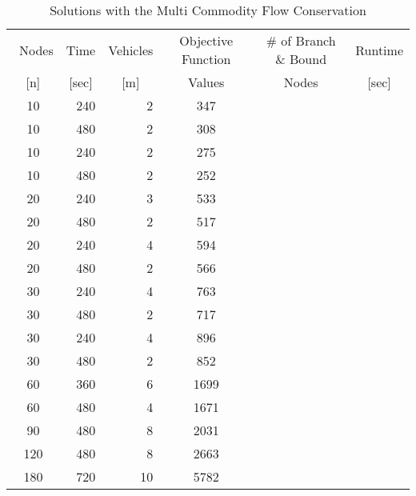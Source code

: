 \documentclass[a4paper]{article}
\begin{document}
\begin{table}[h!]
	\centering
	\caption{Solutions with the Multi Commodity Flow Conservation}
		\begin{tabular}{|c|r|r||c|c|c|}
			\hline\
		Nodes & Time & Vehicles	& Objective Function & \# of Branch \& Bound & Runtime\\
   		\multicolumn{1}{|c|}{[n]} & \multicolumn{1}{c|}{[sec]} & \multicolumn{1}{c||}{[m]} & \multicolumn{1}{c|}{Values} & \multicolumn{1}{c|}{Nodes} & \multicolumn{1}{c|}{[sec]} \\
			\hline 
				10	&	240	&	2	&	347		&		&		\\
				10	&	480	&	2	&	308		&		&		\\
				10	&	240	&	2	&	275		&		&		\\
				10	&	480	&	2	&	252		&		&		\\
				20	&	240	&	3	&	533		&		&		\\
				20	&	480	&	2	&	517		&		&		\\
				20	&	240	&	4	&	594		&		&		\\
				20	&	480	&	2	&	566		&		&		\\
				30	&	240	&	4	&	763		&		&		\\
				30	&	480	&	2	&	717		&		&		\\
				30	&	240	&	4	&	896		&		&		\\
				30	&	480	&	2	&	852		&		&		\\
				60	&	360	&	6	&	1699	&		&		\\
				60	&	480	&	4	&	1671	&		&		\\
				90	&	480	&	8	&	2031	&		&		\\
				120	&	480	&	8	&	2663	&		&		\\
				180	&	720	&	10	&	5782	&		&		\\
				
			\hline 
		\end{tabular}
	\label{tab:scf}
\end{table}
\end{document}
